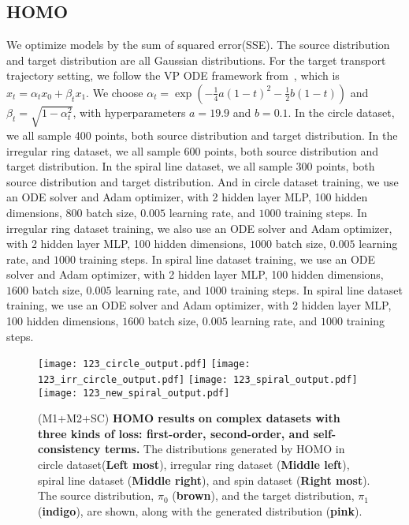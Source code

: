 \subsection{HOMO}\label{sec:app:homo2}
We optimize models by the sum of squared error(SSE). The source distribution and target distribution are all Gaussian distributions. For the target transport trajectory setting, we follow the VP ODE framework from~\cite{rectified_flow}, which is $x_t = \alpha_t x_0 + \beta_t x_1$. We choose $\alpha_t = \exp(-\frac{1}{4} a(1-t)^2 - \frac{1}{2} b(1-t))$ and $\beta_t = \sqrt{1 - \alpha_t^2}$, with hyperparameters $a = 19.9$ and $b = 0.1$. In the circle dataset, we all sample 400 points, both source distribution and target distribution. In the irregular ring dataset, we all sample 600 points, both source distribution and target distribution. In the spiral line dataset, we all sample 300 points, both source distribution and target distribution. And in circle dataset training, we use an ODE solver and Adam optimizer, with 2 hidden layer MLP, 100 hidden dimensions, $800$ batch size, $0.005$ learning rate, and $1000$ training steps. In irregular ring dataset training, we also use an ODE solver and Adam optimizer, with 2 hidden layer MLP, 100 hidden dimensions, $1000$ batch size, $0.005$ learning rate, and $1000$ training steps. In spiral line dataset training, we use an ODE solver and Adam optimizer, with 2 hidden layer MLP, 100 hidden dimensions, $1600$ batch size, $0.005$ learning rate, and $1000$ training steps. In spiral line dataset training, we use an ODE solver and Adam optimizer, with 2 hidden layer MLP, 100 hidden dimensions, $1600$ batch size, $0.005$ learning rate, and $1000$ training steps. 
\begin{figure}[!ht]
\centering
\texttt{[image: 123\_circle\_output.pdf]}
\texttt{[image: 123\_irr\_circle\_output.pdf]}
\texttt{[image: 123\_spiral\_output.pdf]}
\texttt{[image: 123\_new\_spiral\_output.pdf]}
\caption{
(M1+M2+SC) \textbf{HOMO results on complex datasets with three kinds of loss: first-order, second-order, and self-consistency terms.} The distributions generated by HOMO in circle dataset(\textbf{Left most}), irregular ring dataset (\textbf{Middle left}), spiral line dataset (\textbf{Middle right}), and spin dataset (\textbf{Right most}). 
The source distribution, $\pi_0$ ({\textbf{brown}}), and the target distribution, $\pi_1$ ({\textbf{indigo}}), are shown, along with the generated distribution ({\textbf{pink}}). }
\label{fig:m1_m2_sc_appendix}
\end{figure}
